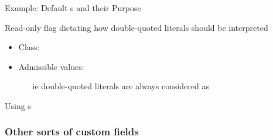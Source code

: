 \documentclass[handout]{beamer}
\begin{document}
\begin{frame}[allowframebreaks]{Example: Default s and their Purpose}
    \begin{block}{}
        Read-only flag dictating how double-quoted literals should be interpreted
        \begin{itemize}
            \item Class: 
            \item Admissible values: 
            \begin{itemize}
                \item[ie] double-quoted literals are always considered as 
            \end{itemize}
        \end{itemize}
    \end{block}
\end{frame}

\begin{frame}{Using s}
\end{frame}

\subsubsection{Other sorts of custom fields}
\end{document}
